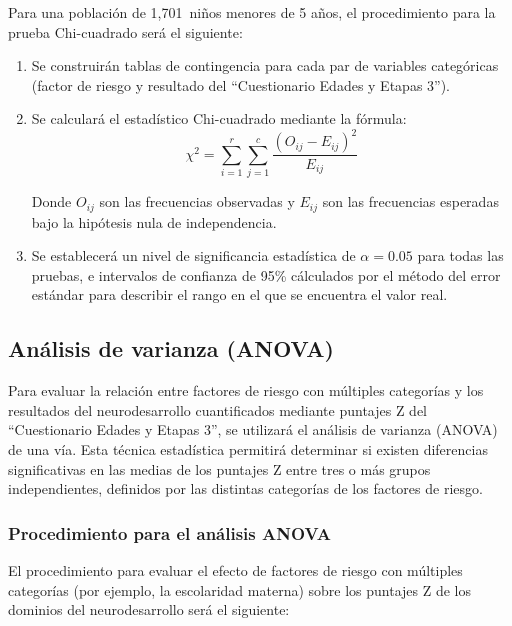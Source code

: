 \documentclass[11pt,letterpaper]{report}
\newcommand{\muestradeseada}{1,701}
\newcommand{\asq}{“Cuestionario Edades y Etapas 3”}
\begin{document}
Para una población de \muestradeseada\ niños menores de 5 años, el
procedimiento para la prueba Chi-cuadrado será el siguiente:

\begin{enumerate}
    \item Se construirán tablas de contingencia para cada par de variables
		categóricas (factor de riesgo y resultado del \asq).
    
    \item Se calculará el estadístico Chi-cuadrado mediante la fórmula:
    \[
    \chi^2 = \sum_{i=1}^r \sum_{j=1}^c \frac{(O_{ij} - E_{ij})^2}{E_{ij}}
    \]
    
    Donde \( O_{ij} \) son las frecuencias observadas y \( E_{ij} \) son las
	frecuencias esperadas bajo la hipótesis nula de independencia.
    
    \item Se establecerá un nivel de significancia estadística de $\alpha = 0.05$
		para todas las pruebas, e intervalos de confianza de 95\% cálculados
		por el método del error estándar para describir el rango en el que se
		encuentra el valor real.
\end{enumerate}

\subsection{Análisis de varianza (ANOVA)}
Para evaluar la relación entre factores de riesgo con múltiples categorías y
los resultados del neurodesarrollo cuantificados mediante puntajes Z del 
\asq, se utilizará el análisis de varianza (ANOVA) de una vía. Esta técnica
estadística permitirá determinar si existen diferencias significativas en las
medias de los puntajes Z entre tres o más grupos independientes, definidos por
las distintas categorías de los factores de riesgo.

\subsubsection{Procedimiento para el análisis ANOVA}
El procedimiento para evaluar el efecto de factores de riesgo con múltiples 
categorías (por ejemplo, la escolaridad materna) sobre los puntajes Z de los 
dominios del neurodesarrollo será el siguiente:
\end{document}
